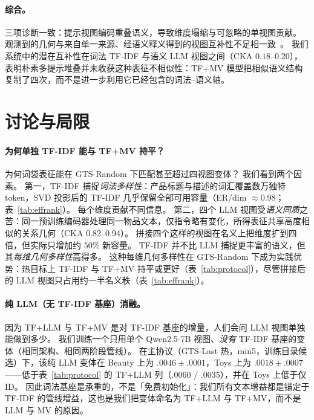 \documentclass[sigconf,natbib=true,anonymous]{acmart}
\newcommand{\tfidf}{\textsc{TF-IDF}\xspace}
\newcommand{\llm}{\textsc{LLM}\xspace}
\newcommand{\tfllm}{\textsc{TF+LLM}\xspace}
\newcommand{\tfmv}{\textsc{TF+MV}\xspace}
\begin{document}
\paragraph{综合。}
三项诊断一致：提示视图编码重叠语义，导致维度塌缩与可忽略的单视图贡献。
观测到的几何与来自单一来源、经语义释义得到的视图互补性不足相一致~\cite{xu2013multiview}。
我们系统中的潜在互补性在词法 \tfidf 与语义 \llm 视图之间（CKA $0.18$--$0.20$），表明朴素多提示堆叠并未收获这种表征不相似性：\tfmv 模型把相似语义结构复制了四次，而不是进一步利用它已经包含的词法--语义轴。

\section{讨论与局限}
\label{sec:discussion}

\paragraph{为何单独 TF-IDF 能与 \tfmv 持平？}
为何词袋表征能在 GTS-Random 下匹配甚至超过四视图变体？
我们看到两个因素。
第一，\tfidf 捕捉\emph{词法多样性}：产品标题与描述的词汇覆盖数万独特 token，SVD 投影后的 TF-IDF 几乎保留全部可用容量（ER/dim $\approx$0.98；表~\ref{tab:effrank}）。
每个维度贡献不同信息。
第二，四个 LLM 视图受\emph{语义同质}之苦：同一预训练编码器处理同一物品文本，仅指令略有变化，所得表征共享高度相似的关系几何（CKA 0.82--0.94）。
拼接四个这样的视图在名义上把维度扩到四倍，但实际只增加约 $50\%$ 新容量。
TF-IDF 并不比 LLM 捕捉更丰富的语义，但其\emph{每维几何多样性}高得多。
这种每维几何多样性在 GTS-Random 下成为实践优势：热目标上 \tfidf 与 \tfmv 持平或更好（表~\ref{tab:protocol}），尽管拼接后的 LLM 视图只占用约一半名义秩（表~\ref{tab:effrank}）。

\paragraph{纯 LLM（无 \tfidf 基座）消融。}
因为 \tfllm 与 \tfmv 是对 \tfidf 基座的增量，人们会问 LLM 视图单独能做到多少。
我们训练一个只用单个 Qwen2.5-7B 视图、\emph{没有} \tfidf 基座的变体（相同架构、相同两阶段管线）。
在主协议（GTS-Last 热，min5，训练目录候选）下，该纯 LLM 变体在 Beauty 上为 $.0046\pm.0001$，Toys 上为 $.0018\pm.0007$——低于表~\ref{tab:protocol} 的 \tfllm 列（$.0060$ / $.0035$），并在 Toys 上低于仅 ID。
因此词法基座是承重的，不是「免费初始化」：我们所有文本增益都是锚定于 \tfidf 的管线增益，这也是我们把变体命名为 \tfllm 与 \tfmv，而不是 LLM 与 MV 的原因。
\end{document}
